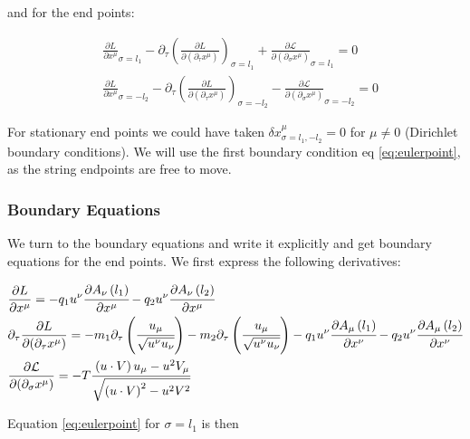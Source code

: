 \documentclass[11pt,a4paper]{article}
\begin{document}
and for the end points:

\begin{subequations}
\label{eq:eulerpoint}
\begin{align}
&\frac{\partial L}{\partial x^{\mu}}_{\sigma=l_{1}}-\partial_{\tau}\left(\frac{\partial L}{\partial(\partial_{\tau}x^{\mu})}\right)_{\sigma=l_{1}}+\frac{\partial\mathcal{L}}{\partial(\partial_{\sigma}x^{\mu})}_{\sigma=l_{1}}=0
\\
&\frac{\partial L}{\partial x^{\mu}}_{\sigma=-l_{2}}-\partial_{\tau}\left(\frac{\partial L}{\partial(\partial_{\tau}x^{\mu})}\right)_{\sigma=-l_{2}}-\frac{\partial\mathcal{L}}{\partial(\partial_{\sigma}x^{\mu})}_{\sigma=-l_{2}}=0
\end{align}
\end{subequations}

For stationary end points we could have taken $\delta x^{\mu}_{\sigma=l_1,-l_2}=0$ for $\mu\neq0$ (Dirichlet boundary conditions). We will use the first boundary condition eq \ref{eq:eulerpoint}, as the string endpoints are free to move.

\FloatBarrier
\subsubsection{Boundary Equations}
\label{sec:boundaryequations}

We turn to the boundary equations and write it explicitly and get boundary equations for the end points.
We first express the following derivatives:

\begin{align}
&\frac{\partial L}{\partial x^{\mu}}=-q_{1}u^{\nu}\cfrac{\partial A_{\nu}\left(l_{1}\right)}{\partial x^{\mu}}-q_{2}u^{\nu}\cfrac{\partial A_{\nu}\left(l_{2}\right)}{\partial x^{\mu}} \\
&\partial_{\tau}\frac{\partial L}{\partial(\partial_{\tau}x^{\mu})}=-m_{1}\partial_{\tau}\left(\cfrac{u_{\mu}}{\sqrt{u^{\nu}u_{\nu}}}\right)-m_{2}\partial_{\tau}\left(\cfrac{u_{\mu}}{\sqrt{u^{\nu}u_{\nu}}}\right)-q_{1}u^{\nu}\cfrac{\partial A_{\mu}\left(l_{1}\right)}{\partial x^{\nu}}-q_{2}u^{\nu}\cfrac{\partial A_{\mu}\left(l_{2}\right)}{\partial x^{\nu}} \\
&\frac{\partial\mathcal{L}}{\partial(\partial_{\sigma}x^{\mu})}=-T\cfrac{\left(u\cdot V\right)u_{\mu}-u^{2}V_{\mu}}{\sqrt{\left(u\cdot V\right)^{2}-u^{2}V^{2}}}
\end{align}

Equation \ref{eq:eulerpoint} for $ \sigma=l_1 $ is then
\end{document}
